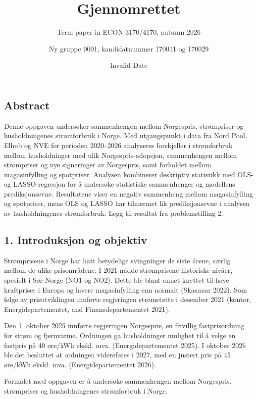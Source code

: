 \documentclass[
  letterpaper,
  DIV=11,
  numbers=noendperiod]{scrartcl}
\title{Gjennomrettet}
\subtitle{Term paper in ECON 3170/4170, autumn 2026}
\author{Ny gruppe 0001, kandidatnummer 170011 og 170029}
\date{Invalid Date}
\renewcommand*\contentsname{Table of contents}
\newcommand\contentsname{Table of contents}
\begin{document}
\maketitle

\renewcommand*\contentsname{Table of contents}
{
\hypersetup{linkcolor=}
\setcounter{tocdepth}{3}
\tableofcontents
}

\subsection{Abstract}\label{abstract}

Denne oppgaven undersøker sammenhengen mellom Norgespris, strømpriser og
husholdningenes strømforbruk i Norge. Med utgangspunkt i data fra Nord
Pool, Elhub og NVE for perioden 2020--2026 analyseres forskjeller i
strømforbruk mellom husholdninger med ulik Norgespris-adopsjon,
sammenhengen mellom strømpriser og nye signeringer av Norgespris, samt
forholdet mellom magasinfylling og spotpriser. Analysen kombinerer
deskriptiv statistikk med OLS- og LASSO-regresjon for å undersøke
statistiske sammenhenger og modellens prediksjonsevne. Resultatene viser
en negativ sammenheng mellom magasinfylling og spotpriser, mens OLS og
LASSO har tilnærmet lik prediksjonsevne i analysen av husholdningenes
strømforbruk. Legg til resultat fra problemstilling 2.

\subsection{1. Introduksjon og objektiv}\label{introduksjon-og-objektiv}

Strømprisene i Norge har hatt betydelige svingninger de siste årene,
særlig mellom de ulike prisområdene. I 2021 nådde strømprisene
historiske nivåer, spesielt i Sør-Norge (NO1 og NO2). Dette ble blant
annet knyttet til høye kraftpriser i Europa og lavere magasinfylling enn
normalt (Skaansar 2022). Som følge av prisutviklingen innførte
regjeringen strømstøtte i desember 2021 (kontor, Energidepartementet,
and Finansdepartementet 2021).

Den 1. oktober 2025 innførte regjeringen Norgespris, en frivillig
fastprisordning for strøm og fjernvarme. Ordningen ga husholdninger
mulighet til å velge en fastpris på 40 øre/kWh ekskl. mva.
(Energidepartementet 2025). I oktober 2026 ble det besluttet at
ordningen videreføres i 2027, med en justert pris på 45 øre/kWh ekskl.
mva. (Energidepartementet 2026).

Formålet med oppgaven er å undersøke sammenhengen mellom Norgespris,
strømpriser og husholdningenes strømforbruk i Norge.
\end{document}
